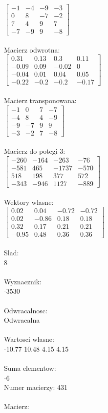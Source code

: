 \documentclass[a4paper,12pt]{article}
\begin{document}
$\begin{bmatrix} -1&-4&-9&-3\\0&8&-7&-2\\7&4&9&7\\-7&-9&9&-8 \end{bmatrix}$
\\
\\
Macierz odwrotna:\\

$\begin{bmatrix} 0.31&0.13&0.3&0.11\\-0.09&0.09&-0.02&0\\-0.04&0.01&0.04&0.05\\-0.22&-0.2&-0.2&-0.17 \end{bmatrix}$
\\
\\
Macierz transponowana:\\

$\begin{bmatrix} -1&0&7&-7\\-4&8&4&-9\\-9&-7&9&9\\-3&-2&7&-8 \end{bmatrix}$
\\
\\
Macierz do potegi 3:\\

$\begin{bmatrix} -260&-164&-263&-76\\-581&465&-1737&-570\\518&198&377&572\\-343&-946&1127&-889 \end{bmatrix}$
\\
\\
Wektory wlasne:\\

$\begin{bmatrix} 0.02&0.04&-0.72&-0.72\\0.02&-0.86&0.18&0.18\\0.32&0.17&0.21&0.21\\-0.95&0.48&0.36&0.36 \end{bmatrix}$
\\
\\
Slad:\\
8
\\
\\
Wyznacznik:\\
-3530
\\
\\
Odwracalnosc:\\
Odwracalna
\\
\\
Wartosci wlasne:\\
-10.77 10.48 4.15 4.15
\\
\\
Suma elementow:\\
-6
\\
\newpage
Numer macierzy:
431
\\
\\
Macierz:\\
\end{document}
